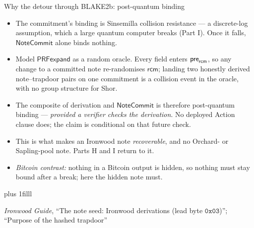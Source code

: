 \documentclass[aspectratio=169,11pt]{beamer}
\newcommand{\rcm}{\ensuremath{\mathsf{rcm}}}
\newcommand{\NoteCommit}{\ensuremath{\mathsf{NoteCommit}}}
\newcommand{\src}[1]{\par\vskip0pt plus 1filll
  {\fontsize{6}{7.2}\selectfont\color{arbdim}\raggedright #1\par}}
\begin{document}
\begin{frame}{Why the detour through BLAKE2b: post-quantum binding}
\begin{itemize}
  \item The commitment's binding is Sinsemilla collision resistance ---
    a discrete-log assumption, which a large quantum computer breaks
    (Part I). Once it falls, \NoteCommit{} alone binds nothing.
  \item Model $\mathsf{PRFexpand}$ as a random oracle. Every field enters
    $\Fpre$, so any change to a committed note re-randomises \rcm; landing
    two honestly derived note--trapdoor pairs on one commitment is a
    collision event in the oracle, with no group structure for Shor.
  \item The composite of derivation and \NoteCommit{} is therefore
    post-quantum binding --- \emph{provided a verifier checks the
    derivation}. No deployed Action clause does; the claim is conditional
    on that future check.
  \item This is what makes an Ironwood note \emph{recoverable}, and no
    Orchard- or Sapling-pool note. Parts H and I return to it.
  \item \emph{Bitcoin contrast:} nothing in a Bitcoin output is hidden,
    so nothing must stay bound after a break; here the hidden note must.
\end{itemize}
\src{\emph{Ironwood Guide}, ``The note seed: Ironwood derivations (lead
  byte $\mathtt{0x03}$)''; ``Purpose of the hashed trapdoor''}
\end{frame}
\end{document}
